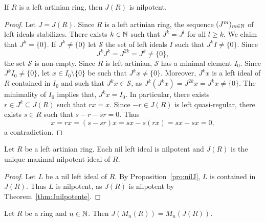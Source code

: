 \begin{theorem}
	\label{thm:Jnilpotente}
	If $R$ is a left artinian ring, then $J(R)$ is nilpotent. 
\end{theorem}

\begin{proof}
	Let $J=J(R)$. Since $R$ is a left artinian ring, the sequence 
	$(J^m)_{m\in\mathbb{N}}$ of left ideals stabilizes. There exists 
	$k\in\mathbb{N}$ such that $J^k=J^l$ for all $l\geq k$. We claim that $J^k=\{0\}$. If
	$J^k\ne\{0\}$ let $\mathcal{S}$ the set of left ideals 
	$I$ such that $J^kI\ne\{0\}$. Since 
	\[
	J^kJ^k=J^{2k}=J^k\ne\{0\},
	\]
	the set $\mathcal{S}$ is non-empty. 
	Since $R$ is left artinian, $\mathcal{S}$ has a minimal element $I_0$. Since $J^kI_0\ne\{0\}$, let $x\in
	I_0\setminus\{0\}$ be such that $J^kx\ne\{0\}$. Moreover, $J^kx$ is a left ideal of $R$ 
	contained in $I_0$ and such that $J^kx\in\mathcal{S}$, as 
	$J^k(J^kx)=J^{2k}x=J^kx\ne\{0\}$. The minimality of $I_0$ implies that, $J^kx=I_0$. In particular, 
	there exists $r\in J^k\subseteq J(R)$ such that $rx=x$. Since $-r\in
	J(R)$ is left quasi-regular, there exists $s\in R$ such that $s-r-sr=0$.
	Thus 
	\[
		x=rx=(s-sr)x=sx-s(rx)=sx-sx=0,
	\]
	a contradiction.
\end{proof}

\begin{corollary}
	Let $R$ be a left artinian ring. Each nil left ideal is nilpotent and 
	$J(R)$ is the unique maximal nilpotent ideal of $R$. 
\end{corollary}

\begin{proof}
	Let $L$ be a nil left ideal of $R$. By Proposition~\ref{pro:nilJ}, $L$
	is contained in $J(R)$. Thus $L$ is nilpotent, as $J(R)$ 
	is nilpotent by Theorem~\ref{thm:Jnilpotente}. 
\end{proof}

\begin{theorem}
	Let $R$ be a ring and $n\in\mathbb{N}$. Then $J(M_n(R))=M_n(J(R))$. 
\end{theorem}

